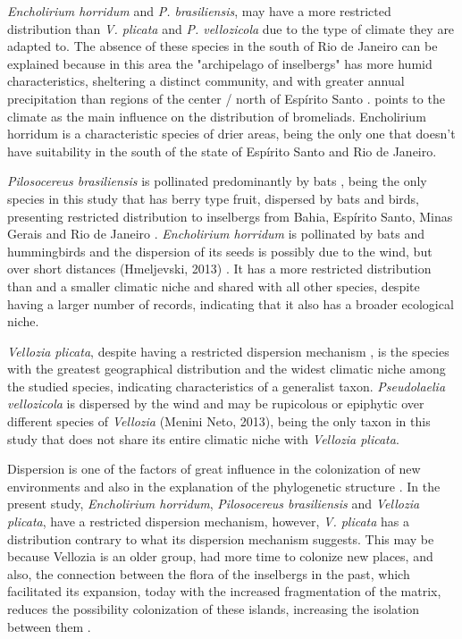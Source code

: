  
\textit{Encholirium horridum} and \textit{P. brasiliensis}, may have a more restricted distribution than \textit{V. plicata} and \textit{P. vellozicola} due to the type of climate they are adapted to. The absence of these species in the south of Rio de Janeiro can be explained because in this area the "archipelago of inselbergs" has more humid characteristics, sheltering a distinct community, and with greater annual precipitation than regions of the center / north of Espírito Santo \citep{oliveira-filho2000PatternsFloristicDifferentiation}. \citet{depaula2016SugarLoafLand} points to the climate as the main influence on the distribution of bromeliads. Encholirium horridum is a characteristic species of drier areas, being the only one that doesn't have suitability in the south of the state of Espírito Santo and Rio de Janeiro.
 
\textit{Pilosocereus brasiliensis} is pollinated predominantly by bats \citep{lucena2007FenologiaBiologiaPolinizacao, taylor2004CactiEasternBrazil}, being the only species in this study that has berry type fruit, dispersed by bats and birds, presenting restricted distribution to inselbergs from Bahia, Espírito Santo, Minas Gerais and Rio de Janeiro \citep{bfg2018BrazilianFlora2020}. \textit{Encholirium horridum} is pollinated by bats and hummingbirds and the dispersion of its seeds is possibly due to the wind, but over short distances (Hmeljevski, 2013) \citep{hmeljevski2015PatternsGeneFlow}. It has a more restricted distribution than \citep{Pilosocereus brasiliensis} and a smaller climatic niche and shared with all other species, despite having a larger number of records, indicating that it also has a broader ecological niche.

\textit{Vellozia plicata}, despite having a restricted dispersion mechanism \citep{franceschinelli2006GeneticDiversityTwo, jacobi2007PollinationTwoSpecies}, is the species with the greatest geographical distribution and the widest climatic niche among the studied species, indicating characteristics of a generalist taxon. \textit{Pseudolaelia vellozicola} is dispersed by the wind and may be rupicolous or epiphytic over different species of \textit{Vellozia} (Menini Neto, 2013), being the only taxon in this study that does not share its entire climatic niche with \textit{Vellozia plicata}.

Dispersion is one of the factors of great influence in the colonization of new environments and also in the explanation of the phylogenetic structure \citep{parmentier2009ImpactEcologicalDifferentiation}. In the present study, \textit{Encholirium horridum}, \textit{Pilosocereus brasiliensis} and \textit{Vellozia plicata}, have a restricted dispersion mechanism, however, \textit{V. plicata} has a distribution contrary to what its dispersion mechanism suggests. This may be because Vellozia is an older group, had more time to colonize new places, and also, the connection between the flora of the inselbergs in the past, which facilitated its expansion, today with the increased fragmentation of the matrix, reduces the possibility colonization of these islands, increasing the isolation between them \citep{mello-silva2011FiveVicariousGenera, safford1999BrazilianParamosIntroduction}.


